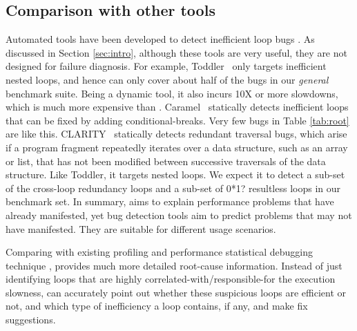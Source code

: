 \subsection{Comparison with other tools}

Automated tools have been developed to detect inefficient loop bugs
\cite{Alabama, CARAMEL, IsilDillig.PLDI15}. 
As discussed in Section \ref{sec:intro}, although these tools are very
useful, they are not designed for failure diagnosis. 
For example, Toddler~\cite{Alabama} only targets inefficient nested loops, and
hence can only cover about half of the bugs in our \emph{general} benchmark suite.
Being a dynamic tool, it also incurs 10X or more slowdowns, which is much more
expensive than \Tool. 
Caramel~\cite{CARAMEL} statically detects inefficient loops that can be fixed
by adding conditional-breaks. Very few bugs in Table \ref{tab:root} are like this.
CLARITY~\cite{IsilDillig.PLDI15} statically detects redundant traversal bugs, 
which arise if a program fragment repeatedly iterates over a data structure, such as an array or list, that has not been modified between successive traversals of the data structure.
Like Toddler, it targets nested loops.
We expect it to detect a sub-set of the cross-loop redundancy
loops and a sub-set of 0*1? resultless loops in our benchmark set.
In summary, \Tool aims to explain performance problems that have 
already manifested,
yet bug detection tools aim to predict problems that may not have manifested.
They are suitable for different usage scenarios.

Comparing with existing profiling and performance
statistical debugging technique \cite{SongOOPSLA2014}, \Tool provides much
more detailed root-cause information. Instead of just identifying loops that
are highly correlated-with/responsible-for the execution slowness, \Tool
can accurately point out whether these suspicious loops are efficient or not,
and which type of inefficiency a loop contains, if any, and make fix suggestions.
